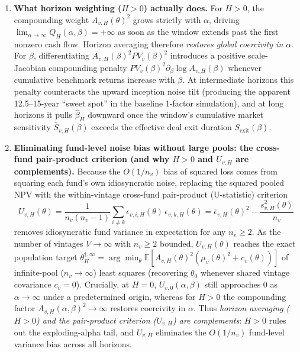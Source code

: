 \documentclass[11pt]{article}
\newcommand{\E}{\mathbb{E}}
\begin{document}
\begin{enumerate}
\item \textbf{What horizon weighting ($H>0$) actually does.} For $H>0$, the compounding weight $A_{v,H}(\theta)^2$ grows strictly with $\alpha$, driving $\lim_{\alpha\to\infty}Q_H(\alpha,\beta)=+\infty$ as soon as the window extends past the first nonzero cash flow. Horizon averaging therefore \emph{restores global coercivity in $\alpha$}. For $\beta$, differentiating $A_{v,H}(\beta)^2PV_v(\beta)^2$ introduces a positive scale-Jacobian compounding penalty $PV_v(\beta)^2\partial_\beta\log A_{v,H}(\beta)$ whenever cumulative benchmark returns increase with $\beta$. At intermediate horizons this penalty counteracts the upward inception noise tilt (producing the apparent 12.5--15-year ``sweet spot'' in the baseline 1-factor simulation), and at long horizons it pulls $\hat\beta_H$ downward once the window's cumulative market sensitivity $\bar S_{v,H}(\beta)$ exceeds the effective deal exit duration $S_{\mathrm{exit}}(\beta)$.
\item \textbf{Eliminating fund-level noise bias without large pools: the cross-fund pair-product criterion (and why $H>0$ and $U_{v,H}$ are complements).} Because the $O(1/n_v)$ bias of squared loss comes from squaring each fund's own idiosyncratic noise, replacing the squared pooled NPV with the within-vintage cross-fund pair-product (U-statistic) criterion
\[
U_{v,H}(\theta)=\frac{1}{n_v(n_v-1)}\sum_{i\neq k}\epsilon_{v,i,H}(\theta)\,\epsilon_{v,k,H}(\theta)=\bar\epsilon_{v,H}(\theta)^2-\frac{s_{v,H}^2(\theta)}{n_v}
\]
removes idiosyncratic fund variance in expectation for any $n_v\ge 2$. As the number of vintages $V\to\infty$ with $n_v\ge 2$ bounded, $U_{v,H}(\theta)$ reaches the exact population target $\theta_H^{\dagger,\infty}=\arg\min_\theta\E[A_{v,H}(\theta)^2(\mu_v(\theta)^2+c_v(\theta))]$ of infinite-pool ($n_v\to\infty$) least squares (recovering $\theta_0$ whenever shared vintage covariance $c_v=0$). Crucially, at $H=0$, $U_{v,0}(\alpha,\beta)$ still approaches $0$ as $\alpha\to\infty$ under a predetermined origin, whereas for $H>0$ the compounding factor $A_{v,H}(\alpha,\beta)^2\to\infty$ restores coercivity in $\alpha$. Thus \emph{horizon averaging ($H>0$) and the pair-product criterion ($U_{v,H}$) are complements}: $H>0$ rules out the exploding-alpha tail, and $U_{v,H}$ eliminates the $O(1/n_v)$ fund-level variance bias across all horizons.
\end{enumerate}
\end{document}

